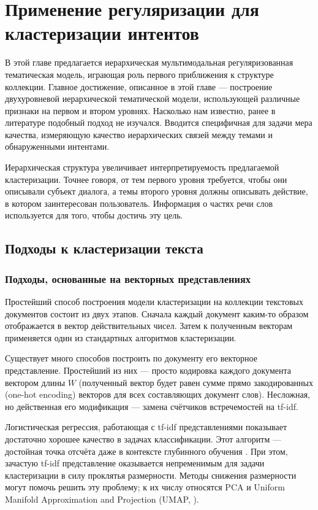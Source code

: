 \chapter{Применение регуляризации для кластеризации интентов}



В этой главе предлагается иерархическая мультимодальная регуляризованная тематическая модель, играющая роль первого приближения к структуре коллекции. Главное достижение, описанное в этой главе --- построение двухуровневой иерархической тематической модели, использующей различные признаки на первом и втором уровнях. Насколько нам известно, ранее в литературе подобный подход не изучался.  Вводится специфичная для задачи мера качества, измеряющую качество иерархических связей между темами и обнаруженными интентами.

Иерархическая структура увеличивает интерпретируемость предлагаемой кластеризации. Точнее говоря, от тем первого уровня требуется, чтобы они описывали субъект диалога, а темы второго уровня должны описывать действие, в котором заинтересован пользователь. Информация о частях речи слов используется для того, чтобы достичь эту цель.


\section{Подходы к кластеризации текста}
\subsection{Подходы, основанные на векторных представлениях} \label{embeddings}

\par Простейший способ построения модели кластеризации на коллекции текстовых документов состоит из двух этапов. Сначала каждый документ каким-то образом отображается в вектор действительных чисел. Затем к полученным векторам применяется один из стандартных алгоритмов кластеризации.

\par Существует много способов построить по документу его векторное представление. Простейший из них --- просто кодировка каждого документа вектором длины $W$ (полученный вектор будет равен сумме прямо закодированных (one-hot encoding) векторов для всех составляющих документ слов). Несложная, но действенная его модификация --- замена счётчиков встречемостей на tf-idf.

Логистическая регрессия, работающая с tf-idf представлениями показывает достаточно хорошее качество в задачах классификации. Этот алгоритм --- достойная точка отсчёта даже в контексте глубинного обучения \cite{park2019adc}. При этом, зачастую tf-idf представление оказывается непременимым для задачи кластеризации в силу проклятья размерности. Методы снижения размерности могут помочь решить эту проблему; к их числу относятся PCA и Uniform Manifold Approximation and Projection (UMAP, \cite{mcinnes2018umap}).

